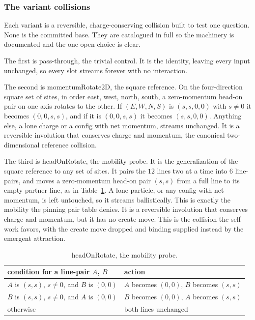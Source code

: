 \subsubsection{The variant collisions}

Each variant is a reversible, charge-conserving collision built to test one question. None is the committed base. They are catalogued in full so the machinery is documented and the one open choice is clear.

The first is pass-through, the trivial control. It is the identity, leaving every input unchanged, so every slot streams forever with no interaction.

The second is momentumRotate2D, the square reference. On the four-direction square set of sites, in order east, west, north, south, a zero-momentum head-on pair on one axis rotates to the other. If $(E,W,N,S)$ is $(s,s,0,0)$ with $s \neq 0$ it becomes $(0,0,s,s)$, and if it is $(0,0,s,s)$ it becomes $(s,s,0,0)$. Anything else, a lone charge or a config with net momentum, streams unchanged. It is a reversible involution that conserves charge and momentum, the canonical two-dimensional reference collision.

The third is headOnRotate, the mobility probe. It is the generalization of the square reference to any set of sites. It pairs the $12$ lines two at a time into $6$ line-pairs, and moves a zero-momentum head-on pair $(s,s)$ from a full line to its empty partner line, as in Table~\ref{tab:headon}. A lone particle, or any config with net momentum, is left untouched, so it streams ballistically. This is exactly the mobility the pinning pair table denies. It is a reversible involution that conserves charge and momentum, but it has no create move. This is the collision the self work favors, with the create move dropped and binding supplied instead by the emergent attraction.

\begin{table}[ht]
\centering
\begin{tabular}{@{}ll@{}}
\toprule
condition for a line-pair $A$, $B$ & action \\
\midrule
$A$ is $(s,s)$, $s \neq 0$, and $B$ is $(0,0)$ & $A$ becomes $(0,0)$, $B$ becomes $(s,s)$ \\
$B$ is $(s,s)$, $s \neq 0$, and $A$ is $(0,0)$ & $B$ becomes $(0,0)$, $A$ becomes $(s,s)$ \\
otherwise & both lines unchanged \\
\bottomrule
\end{tabular}
\caption{headOnRotate, the mobility probe.}
\label{tab:headon}
\end{table}

